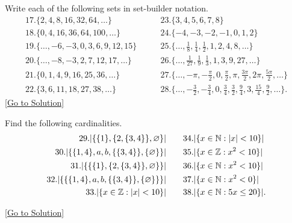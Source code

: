 \begin{exercise}\label{ex:1.2}
    Write each of the following sets in set-builder notation.
    $$
    \begin{aligned}
    17. \{ 2,4,8,16,32,64,\dots \} &\quad\quad 23. \{ 3,4,5,6,7,8 \}\\
    18. \{ 0,4,16,36,64,100,\dots \} &\quad\quad 24. \{ -4,-3,-2,-1,0,1,2 \}\\
    19. \{ \dots,-6,-3,0,3,6,9,12,15 \} &\quad\quad 25. \{ \dots,\frac{1}{8},\frac{1}{4},\frac{1}{2},1,2,4,8,\dots \}\\
    20. \{ \dots,-8,-3,2,7,12,17,\dots \} &\quad\quad 26. \{ \dots,\frac{1}{27},\frac{1}{9},\frac{1}{3},1,3,9,27,\dots \}\\
    21. \{ 0,1,4,9,16,25,36,\dots \} &\quad\quad 27. \{ \dots,-\pi,-\frac{\pi}{2},0,\frac{\pi}{2}, \pi,\frac{3\pi}{2},2\pi,\frac{5\pi}{2},\dots \}\\
    22. \{ 3,6,11,18,27,38,\dots \} &\quad\quad 28.\{ \dots,-\frac{3}{2},-\frac{3}{4},0,\frac{3}{4},\frac{3}{2},\frac{9}{4},3,\frac{15}{4},\frac{9}{2},\dots \}.
    \end{aligned}
    $$
    \hyperref[sol:1.2]{[Go to Solution]}
\end{exercise}

\begin{exercise}\label{ex:1.3}
    Find the following cardinalities. 
    $$
    \begin{aligned}
    29. \lvert \{ \{ 1 \},\{ 2,\{ 3,4 \} \},\varnothing \} \rvert &\quad\quad 34. \lvert \{ x\in\mathbb{N}:\lvert x \rvert<10 \} \rvert\\
    30. \lvert \{ \{ 1,4 \},a,b,\{ \{ 3,4 \} \},\{ \varnothing \} \} \rvert &\quad\quad 35. \lvert \{ x\in\mathbb{Z}:x^2<10 \} \rvert\\
    31. \lvert \{ \{ \{ 1 \},\{ 2, \{ 3,4 \} \},\varnothing \} \} \rvert &\quad\quad 36. \lvert \{ x\in\mathbb{N}:x^2<10 \} \rvert\\
    32. \lvert \{ \{ \{ 1,4 \},a,b,\{ \{ 3,4 \} \},\{ \varnothing \} \} \} \rvert &\quad\quad 37. \lvert \{ x\in\mathbb{N}:x^2<0 \} \rvert\\
    33. \lvert \{ x\in\mathbb{Z}: \lvert x \rvert<10 \} \rvert &\quad\quad 38. \lvert \{ x\in\mathbb{N}:5x\le 20 \} \rvert.
    \end{aligned}
    $$
\end{exercise}\hyperref[sol:1.3]{[Go to Solution]}

